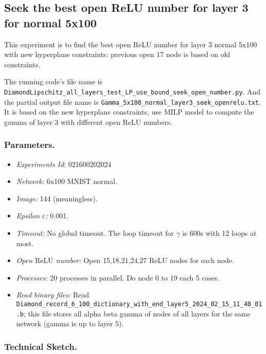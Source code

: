 \documentclass{llncs}
\newcommand{\ReLU}{\mathrm{ReLU}}
\begin{document}
\subsection{Seek the best open ReLU number for layer 3 for normal 5x100}

This experiment is to find the best open ReLU number for layer 3 normal 5x100 with new hyperplane constraints: previous open 17 node is based on old constraints.

\vspace*{1ex}

The running code's file name is \verb*|DiamondLipschitz_all_layers_test_LP_use_bound_seek_open_number.py|. And the partial output file name is \verb*|Gamma_5x100_normal_layer3_seek_openrelu.txt|.  It is based on the new hyperplane constraints, use MILP model to compute the gamma of layer 3 with different open ReLU numbers.

\subsubsection*{Parameters.}

\begin{itemize}
	\item\emph{Experiments Id}: 021600202024
	
	\item\emph{Network:} 6x100 MNIST normal. 
	
	\item\emph{Image:} 144 (meaningless).
	
	\item\emph{Epsilon $\varepsilon$:} 0.001.
	
	\item\emph{Timeout:} No global timeout. The loop timeout for $\gamma$ is 600s with 12 loops at most.
	
	\item\emph{Open $\ReLU$ number:} Open 15,18,21,24,27 ReLU nodes for each node.
	
	\item\emph{Processes:} 20 processes in parallel. Do node 0 to 19 each 5 cases.
	
	\item\emph{Read binary files:} Read \verb*|Diamond_record_6_100_dictionary_with_end_layer5_2024_02_15_11_40_01.b|; this file stores all alpha beta gamma of nodes of all layers for the same network (gamma is up to layer 5). 
\end{itemize}


\subsubsection*{Technical Sketch.}
\end{document}
